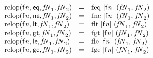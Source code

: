 $$
\begin{array}{@{}lcl@{}l@{}}
{\mathrm{relop}}({\mathsf{f}}{{\mathit{n}}}, \mathsf{eq}, {\mathit{fN}}_{{1}}, {\mathit{fN}}_{{2}}) &=& {\mathrm{feq}}~{|{\mathsf{f}}{{\mathit{n}}}|}~({\mathit{fN}}_{{1}},\, {\mathit{fN}}_{{2}}) &  \\
{\mathrm{relop}}({\mathsf{f}}{{\mathit{n}}}, \mathsf{ne}, {\mathit{fN}}_{{1}}, {\mathit{fN}}_{{2}}) &=& {\mathrm{fne}}~{|{\mathsf{f}}{{\mathit{n}}}|}~({\mathit{fN}}_{{1}},\, {\mathit{fN}}_{{2}}) &  \\
{\mathrm{relop}}({\mathsf{f}}{{\mathit{n}}}, \mathsf{lt}, {\mathit{fN}}_{{1}}, {\mathit{fN}}_{{2}}) &=& {\mathrm{flt}}~{|{\mathsf{f}}{{\mathit{n}}}|}~({\mathit{fN}}_{{1}},\, {\mathit{fN}}_{{2}}) &  \\
{\mathrm{relop}}({\mathsf{f}}{{\mathit{n}}}, \mathsf{gt}, {\mathit{fN}}_{{1}}, {\mathit{fN}}_{{2}}) &=& {\mathrm{fgt}}~{|{\mathsf{f}}{{\mathit{n}}}|}~({\mathit{fN}}_{{1}},\, {\mathit{fN}}_{{2}}) &  \\
{\mathrm{relop}}({\mathsf{f}}{{\mathit{n}}}, \mathsf{le}, {\mathit{fN}}_{{1}}, {\mathit{fN}}_{{2}}) &=& {\mathrm{fle}}~{|{\mathsf{f}}{{\mathit{n}}}|}~({\mathit{fN}}_{{1}},\, {\mathit{fN}}_{{2}}) &  \\
{\mathrm{relop}}({\mathsf{f}}{{\mathit{n}}}, \mathsf{ge}, {\mathit{fN}}_{{1}}, {\mathit{fN}}_{{2}}) &=& {\mathrm{fge}}~{|{\mathsf{f}}{{\mathit{n}}}|}~({\mathit{fN}}_{{1}},\, {\mathit{fN}}_{{2}}) &  \\
\end{array}
$$

